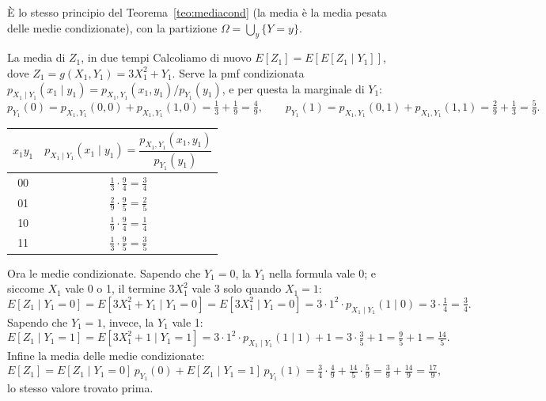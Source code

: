 
È lo stesso principio del Teorema~\ref{teo:mediacond} (la media è la media pesata delle medie condizionate), con la
partizione $\Omega = \bigcup_y \{Y = y\}$.

\begin{esempio}{La media di $Z_1$, in due tempi}
Calcoliamo di nuovo $E[Z_1] = E[E[Z_1 \mid Y_1]]$, dove $Z_1 = g(X_1, Y_1) = 3X_1^2 + Y_1$. Serve la pmf condizionata
$p_{X_1 \mid Y_1}(x_1 \mid y_1) = p_{X_1,Y_1}(x_1, y_1)/p_{Y_1}(y_1)$, e per questa la marginale di $Y_1$:
\[
  p_{Y_1}(0) = p_{X_1,Y_1}(0, 0) + p_{X_1,Y_1}(1, 0) = \tfrac13 + \tfrac19 = \tfrac49 , \qquad
  p_{Y_1}(1) = p_{X_1,Y_1}(0, 1) + p_{X_1,Y_1}(1, 1) = \tfrac29 + \tfrac13 = \tfrac59 .
\]
\begin{center}
\renewcommand{\arraystretch}{1.5}
\begin{tabular}{@{}cc@{}}
  \toprule
  $x_1 y_1$ & $p_{X_1 \mid Y_1}(x_1 \mid y_1) = \dfrac{p_{X_1,Y_1}(x_1, y_1)}{p_{Y_1}(y_1)}$ \\
  \midrule
  00 & $\frac13 \cdot \frac94 = \frac34$ \\
  01 & $\frac29 \cdot \frac95 = \frac25$ \\
  10 & $\frac19 \cdot \frac94 = \frac14$ \\
  11 & $\frac13 \cdot \frac95 = \frac35$ \\
  \bottomrule
\end{tabular}
\end{center}
Ora le medie condizionate. Sapendo che $Y_1 = 0$, la $Y_1$ nella formula vale 0; e siccome $X_1$ vale 0 o 1, il termine
$3X_1^2$ vale 3 solo quando $X_1 = 1$:
\[
  E[Z_1 \mid Y_1 = 0] = E[3X_1^2 + Y_1 \mid Y_1 = 0] = E[3X_1^2 \mid Y_1 = 0] = 3 \cdot 1^2 \cdot p_{X_1 \mid Y_1}(1 \mid 0)
  = 3 \cdot \tfrac14 = \tfrac34 .
\]
Sapendo che $Y_1 = 1$, invece, la $Y_1$ vale 1:
\[
  E[Z_1 \mid Y_1 = 1] = E[3X_1^2 + 1 \mid Y_1 = 1] = 3 \cdot 1^2 \cdot p_{X_1 \mid Y_1}(1 \mid 1) + 1 = 3 \cdot \tfrac35
  + 1 = \tfrac95 + 1 = \tfrac{14}{5} .
\]
Infine la media delle medie condizionate:
\[
  E[Z_1] = E[Z_1 \mid Y_1 = 0]\, p_{Y_1}(0) + E[Z_1 \mid Y_1 = 1]\, p_{Y_1}(1) = \tfrac34 \cdot \tfrac49 + \tfrac{14}{5}
  \cdot \tfrac59 = \tfrac39 + \tfrac{14}{9} = \tfrac{17}{9} ,
\]
lo stesso valore trovato prima.
\end{esempio}

